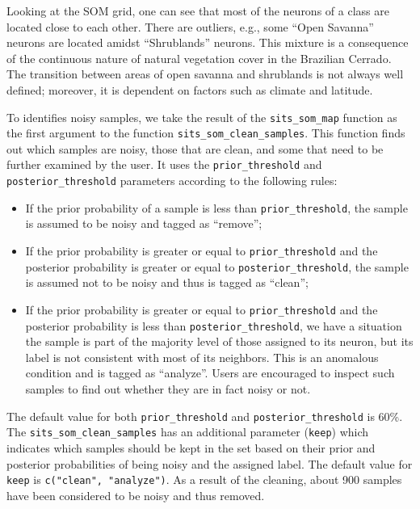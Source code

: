 \documentclass[a4paper,]{tufte-book}
\providecommand{\tightlist}{%
  \setlength{\itemsep}{0pt}\setlength{\parskip}{0pt}}
\begin{document}
Looking at the SOM grid, one can see that most of the neurons of a class are located close to each other. There are outliers, e.g., some ``Open Savanna'' neurons are located amidst ``Shrublands'' neurons. This mixture is a consequence of the continuous nature of natural vegetation cover in the Brazilian Cerrado. The transition between areas of open savanna and shrublands is not always well defined; moreover, it is dependent on factors such as climate and latitude.

To identifies noisy samples, we take the result of the \texttt{sits\_som\_map} function as the first argument to the function \texttt{sits\_som\_clean\_samples}. This function finds out which samples are noisy, those that are clean, and some that need to be further examined by the user. It uses the \texttt{prior\_threshold} and \texttt{posterior\_threshold} parameters according to the following rules:

\begin{itemize}
\tightlist
\item
  If the prior probability of a sample is less than \texttt{prior\_threshold}, the sample is assumed to be noisy and tagged as ``remove'';
\item
  If the prior probability is greater or equal to \texttt{prior\_threshold} and the posterior probability is greater or equal to \texttt{posterior\_threshold}, the sample is assumed not to be noisy and thus is tagged as ``clean'';
\item
  If the prior probability is greater or equal to \texttt{prior\_threshold} and the posterior probability is less than \texttt{posterior\_threshold}, we have a situation the sample is part of the majority level of those assigned to its neuron, but its label is not consistent with most of its neighbors. This is an anomalous condition and is tagged as ``analyze''. Users are encouraged to inspect
  such samples to find out whether they are in fact noisy or not.
\end{itemize}

The default value for both \texttt{prior\_threshold} and \texttt{posterior\_threshold} is 60\%. The \texttt{sits\_som\_clean\_samples} has an additional parameter (\texttt{keep}) which indicates which samples should be kept in the set based on their prior and posterior probabilities of being noisy and the assigned label. The default value for \texttt{keep} is \texttt{c("clean",\ "analyze")}. As a result of the cleaning, about 900 samples have been considered to be noisy and thus removed.
\end{document}
